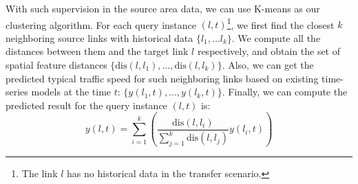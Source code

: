 With such supervision in the source area data,
we can use K-means as our clustering algorithm.
For each query instance $(l,t)$\footnote{The link $l$ has no historical data in the transfer scenario.}, we first find the closest $k$ neighboring source links with historical data $\{l_1,...l_k\}$.
We compute all the distances between them and the target link $l$ respectively, and obtain the set of spatial feature distances $\{\text{dis}(l,l_1),...,\text{dis}(l,l_k)\}$.
Also, we can get the predicted typical traffic speed for such neighboring links based on existing time-series models  at the time $t$: $\{y(l_1,t),...,y(l_k,t)\}$.
Finally, we can compute the predicted result for the query instance $(l,t)$ is:
$$ y(l,t) = \sum_{i=1}^k \left( \frac{\text{dis}(l,l_i)}{\sum_{j=1}^k \text{dis}(l,l_j)} 
y(l_i,t)
\right)$$ 

